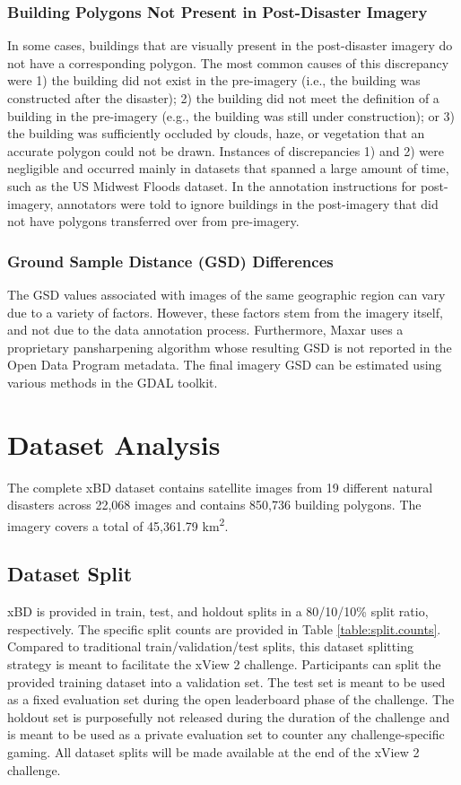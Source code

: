 \documentclass[10pt,twocolumn,letterpaper]{article}
\begin{document}
\vspace{-0.3cm}
\subsubsection{Building Polygons Not Present in Post-Disaster Imagery}
In some cases, buildings that are visually present in the post-disaster imagery  do not have a corresponding polygon.
The most common causes of this discrepancy were 1) the building did not exist in the pre-imagery (i.e., the building was constructed after the disaster); 2) the building did not meet the definition of a building  in the pre-imagery (e.g., the building was still under construction); or 3) the building was sufficiently occluded by clouds, haze, or vegetation that an accurate polygon could not be drawn.
Instances of discrepancies 1) and 2) were negligible and occurred mainly in datasets that spanned a large amount of time, such as the US Midwest Floods dataset.
In the annotation instructions for post-imagery, annotators were told to ignore buildings in the post-imagery that did not have polygons transferred over from pre-imagery.

\vspace{-0.3cm}
\subsubsection{Ground Sample Distance (GSD) Differences}
The GSD values associated with images of the same geographic region can vary due to a variety of factors.
However, these factors stem from the imagery itself, and not due to the data annotation process.
Furthermore, Maxar uses a proprietary pansharpening algorithm whose resulting GSD is not reported in the Open Data Program metadata.
The final imagery GSD can be estimated using various methods in the GDAL \cite{gdal/ogrcontributorsGDALOGRGeospatial2019} toolkit.

\section{Dataset Analysis}
The complete xBD dataset contains satellite images from 19 different natural disasters across 22,068 images and contains 850,736 building polygons.
The imagery covers a total of 45,361.79 km\textsuperscript{2}.

\subsection{Dataset Split}
xBD is provided in train, test, and holdout splits in a 80/10/10\% split ratio, respectively.
The specific split counts are provided in Table \ref{table:split.counts}.
Compared to traditional train/validation/test splits, this dataset splitting strategy is meant to facilitate the xView 2 challenge.
Participants can split the provided training dataset into a validation set.
The test set is meant to be used as a fixed evaluation set during the open leaderboard phase of the challenge.
The holdout set is purposefully not released during the duration of the challenge and is meant to be used as a private evaluation set to counter any challenge-specific gaming.
All dataset splits will be made available at the end of the xView 2 challenge.
\end{document}
